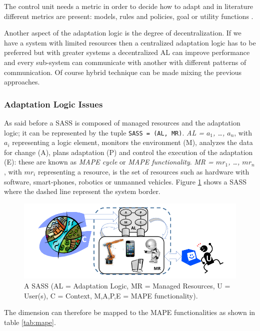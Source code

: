 The control unit needs a metric in order to decide how to adapt and in literature different metrics are present: models, rules and policies, goal or utility functions \cite{autonomic-computing}.

Another aspect of the adaptation logic is the degree of decentralization. If we have a system with limited resources then a centralized adaptation logic has to be preferred but with greater systems a decentralized AL can improve performance and  every sub-system can communicate with another with different patterns of communication. Of course hybrid technique can be made mixing the previous approaches.

\subsubsection{Adaptation Logic Issues}
As said before a SASS is composed of managed resources and the adaptation logic; it can be represented by the tuple \texttt{SASS = (AL, MR)}. \emph{AL = $a_1$, \dots, $a_n$}, with $a_i$ representing a logic element,  monitors the environment (M), analyzes the data for change (A), plans adaptation (P) and control the execution of the adaptation (E): these are known as \emph{MAPE cycle} or \emph{MAPE functionality}\cite{vision-aut-comp}. \emph{MR = $mr_1$, \dots, $mr_n$}, with $mr_i$ representing a resource, is the set of resources such as hardware with software, smart-phones, robotics or unmanned vehicles. Figure \ref{fig:sass} shows a SASS where the dashed line represent the system border.
\begin{figure}[ht]
	\centerline
	{\includegraphics[scale=0.55]{img/managed-resources.png}}
	\caption[A SASS]{A SASS (AL = Adaptation Logic, MR = Managed Resources, U = User(s), C = Context, M,A,P,E = MAPE functionality).\cite{eng-appr-sas}}
	\label{fig:sass}
\end{figure}
The dimension can therefore be mapped to the MAPE functionalities as shown in table \ref{tab:mape}.
